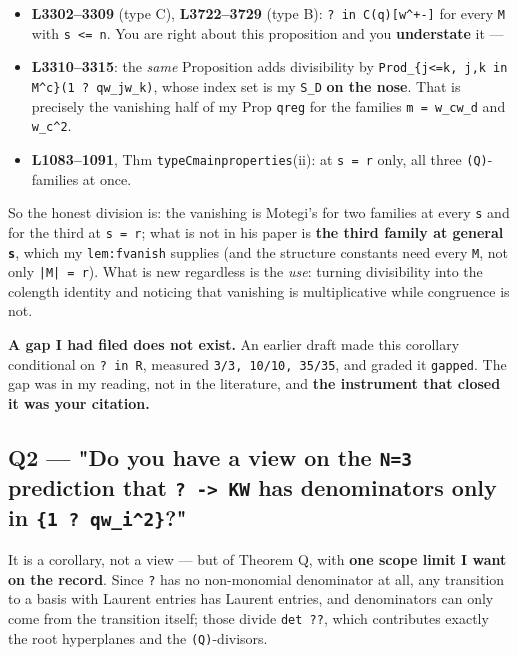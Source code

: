 \documentclass[11pt,a4paper]{article}
\begin{document}
\begin{itemize}
\item \textbf{L3302--3309} (type C), \textbf{L3722--3729} (type B): \mbox{\texttt{? in C(q)[w\textasciicircum{}+-]}} for every \mbox{\texttt{M}} with \mbox{\texttt{s <= n}}. You are right about this proposition and you \textbf{understate} it ---
\item \textbf{L3310--3315}: the \emph{same} Proposition adds divisibility by \mbox{\texttt{Prod\_\{j<=k, j,k in M\textasciicircum{}c\}(1 ? qw\_jw\_k)}}, whose index set is my \mbox{\texttt{S\_D}} \textbf{on the nose}. That is precisely the vanishing half of my Prop \mbox{\texttt{qreg}} for the families \mbox{\texttt{m = w\_cw\_d}} and \mbox{\texttt{w\_c\textasciicircum{}2}}.
\item \textbf{L1083--1091}, Thm \mbox{\texttt{typeCmainproperties}}(ii): at \mbox{\texttt{s = r}} only, all three \mbox{\texttt{(Q)}}-families at once.
\end{itemize}

So the honest division is: the vanishing is Motegi's for two families at every \mbox{\texttt{s}} and for the third at \mbox{\texttt{s = r}}; what is not in his paper is \textbf{the third family at general \mbox{\texttt{s}}}, which my \mbox{\texttt{lem:fvanish}} supplies (and the structure constants need every \mbox{\texttt{M}}, not only \mbox{\texttt{|M| = r}}). What is new regardless is the \emph{use}: turning divisibility into the colength identity and noticing that vanishing is multiplicative while congruence is not.

\textbf{A gap I had filed does not exist.} An earlier draft made this corollary conditional on \mbox{\texttt{? in R}}, measured \mbox{\texttt{3/3, 10/10, 35/35}}, and graded it \mbox{\texttt{gapped}}. The gap was in my reading, not in the literature, and \textbf{the instrument that closed it was your citation.}

\subsection*{Q2 --- "Do you have a view on the \mbox{\texttt{N=3}} prediction that \mbox{\texttt{? -> KW}} has denominators only in \mbox{\texttt{\{1 ? qw\_i\textasciicircum{}2\}}}?"}

It is a corollary, not a view --- but of Theorem Q, with \textbf{one scope limit I want on the record}. Since \mbox{\texttt{?}} has no non-monomial denominator at all, any transition to a basis with Laurent entries has Laurent entries, and denominators can only come from the transition itself; those divide \mbox{\texttt{det ??}}, which contributes exactly the root hyperplanes and the \mbox{\texttt{(Q)}}-divisors.
\end{document}
